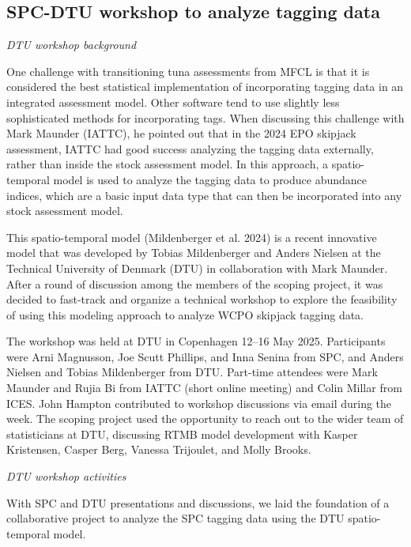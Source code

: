 \documentclass{SCreport}
\begin{document}
\subsection{SPC-DTU workshop to analyze tagging data}
\label{sec:dtu-2025-workshop}

\textit{DTU workshop background}

One challenge with transitioning tuna assessments from MFCL is that it is
considered the best statistical implementation of incorporating tagging data in
an integrated assessment model. Other software tend to use slightly less
sophisticated methods for incorporating tags. When discussing this challenge
with Mark Maunder (IATTC), he pointed out that in the 2024 EPO skipjack
assessment, IATTC had good success analyzing the tagging data externally, rather
than inside the stock assessment model. In this approach, a spatio-temporal
model is used to analyze the tagging data to produce abundance indices, which
are a basic input data type that can then be incorporated into any stock
assessment model.

This spatio-temporal model (Mildenberger et al. 2024) is a recent innovative
model that was developed by Tobias Mildenberger and Anders Nielsen at the
Technical University of Denmark (DTU) in collaboration with Mark Maunder. After
a round of discussion among the members of the scoping project, it was decided
to fast-track and organize a technical workshop to explore the feasibility of
using this modeling approach to analyze WCPO skipjack tagging data.

The workshop was held at DTU in Copenhagen 12--16 May 2025. Participants were
Arni Magnusson, Joe Scutt Phillips, and Inna Senina from SPC, and Anders Nielsen
and Tobias Mildenberger from DTU. Part-time attendees were Mark Maunder and
Rujia Bi from IATTC (short online meeting) and Colin Millar from ICES. John
Hampton contributed to workshop discussions via email during the week. The
scoping project used the opportunity to reach out to the wider team of
statisticians at DTU, discussing RTMB model development with Kasper Kristensen,
Casper Berg, Vanessa Trijoulet, and Molly Brooks.

\vspace{2ex}

\textit{DTU workshop activities}

With SPC and DTU presentations and discussions, we laid the foundation of a
collaborative project to analyze the SPC tagging data using the DTU
spatio-temporal model.
\end{document}

